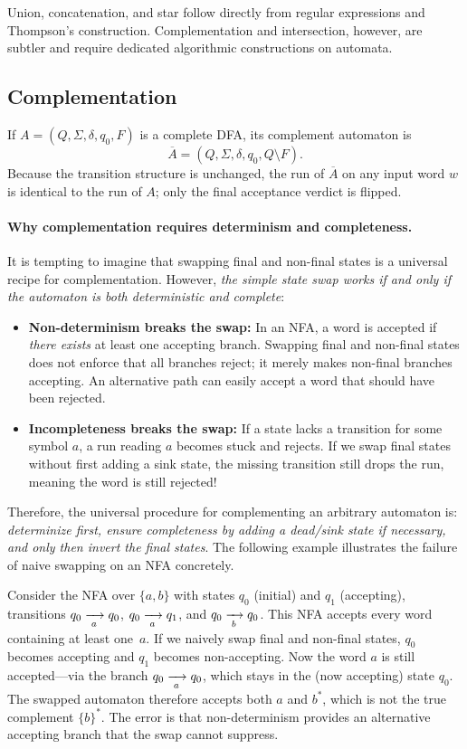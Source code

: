 Union, concatenation, and star follow directly from regular expressions and Thompson's construction. Complementation and intersection, however, are subtler and require dedicated algorithmic constructions on automata.

\subsection{Complementation}
\label{subsec:finite-complementation}

If $A=(Q,\Sigma,\delta,q_0,F)$ is a complete DFA, its complement automaton is
\[
  \overline{A}=(Q,\Sigma,\delta,q_0,Q\setminus F).
\]
Because the transition structure is unchanged, the run of $\overline{A}$ on any input word $w$ is identical to the run of $A$; only the final acceptance verdict is flipped.

\paragraph{Why complementation requires determinism and completeness.}
It is tempting to imagine that swapping final and non-final states is a universal recipe for complementation. However, \emph{the simple state swap works if and only if the automaton is both deterministic and complete}:
\begin{itemize}[nosep]
  \item \textbf{Non-determinism breaks the swap:} In an NFA, a word is accepted if \emph{there exists} at least one accepting branch. Swapping final and non-final states does not enforce that all branches reject; it merely makes non-final branches accepting. An alternative path can easily accept a word that should have been rejected.
  \item \textbf{Incompleteness breaks the swap:} If a state lacks a transition for some symbol $a$, a run reading $a$ becomes stuck and rejects. If we swap final states without first adding a sink state, the missing transition still drops the run, meaning the word is still rejected!
\end{itemize}
Therefore, the universal procedure for complementing an arbitrary automaton is: \emph{determinize first, ensure completeness by adding a dead/sink state if necessary, and only then invert the final states}. The following example illustrates the failure of naive swapping on an NFA concretely.

\begin{example}
\label{ex:complement-nfa-failure}
Consider the NFA over $\{a,b\}$ with states $q_0$ (initial) and $q_1$
(accepting), transitions $q_0\xrightarrow[{\;a\;}]{}q_0$,
$q_0\xrightarrow[{\;a\;}]{}q_1$, and $q_0\xrightarrow[{\;b\;}]{}q_0$.  This NFA
accepts every word containing at least one~$a$.  If we naively swap
final and non-final states, $q_0$ becomes accepting and $q_1$ becomes
non-accepting.  Now the word $a$ is still accepted---via the branch
$q_0\xrightarrow[{\;a\;}]{}q_0$, which stays in the (now accepting) state
$q_0$.  The swapped automaton therefore accepts both $a$ and $b^*$,
which is not the true complement $\{b\}^*$.  The error is that
non-determinism provides an alternative accepting branch that the swap
cannot suppress.
\end{example}

